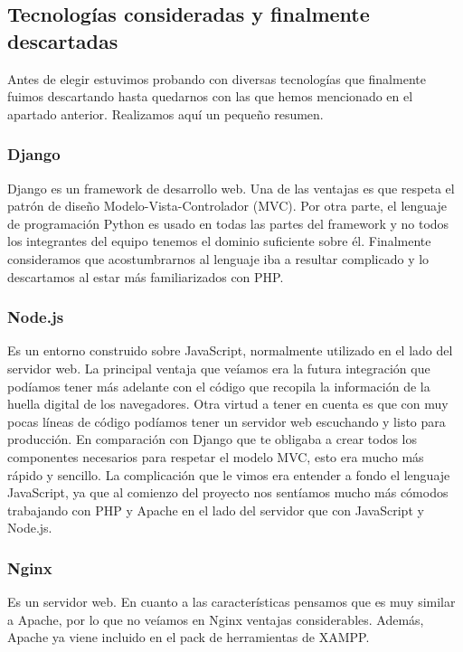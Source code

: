 \subsection{Tecnologías consideradas y finalmente descartadas}
\label{subsec:rejected}
Antes de elegir estuvimos probando con diversas tecnologías que finalmente fuimos descartando hasta quedarnos con las que hemos mencionado en el apartado anterior. Realizamos aquí un pequeño resumen. \par 

\subsubsection{Django}
Django es un framework de desarrollo web. Una de las ventajas es que respeta el patrón de diseño Modelo-Vista-Controlador (MVC). Por otra parte, el lenguaje de programación Python es usado en todas las partes del framework y no todos los integrantes del equipo tenemos el dominio suficiente sobre él. Finalmente consideramos que acostumbrarnos al lenguaje iba a resultar complicado y lo descartamos al estar más familiarizados con PHP. \par 

\subsubsection{Node.js}
Es un entorno construido sobre JavaScript, normalmente utilizado en el lado del servidor web. La principal ventaja que veíamos era la futura integración que podíamos tener más adelante con el código que recopila la información de la huella digital de los navegadores. Otra virtud a tener en cuenta es que con muy pocas líneas de código podíamos tener un servidor web escuchando y listo para producción. En comparación con Django que te obligaba a crear todos los componentes necesarios para respetar el modelo MVC, esto era mucho más rápido y sencillo. La complicación que le vimos era entender a fondo el lenguaje JavaScript, ya que al comienzo del proyecto nos sentíamos mucho más cómodos trabajando con PHP y Apache en el lado del servidor que con JavaScript y Node.js. \par 

\subsubsection{Nginx}
Es un servidor web. En cuanto a las características pensamos que es muy similar a Apache, por lo que no veíamos en Nginx ventajas considerables. Además, Apache ya viene incluido en el pack de herramientas de XAMPP. \par 

